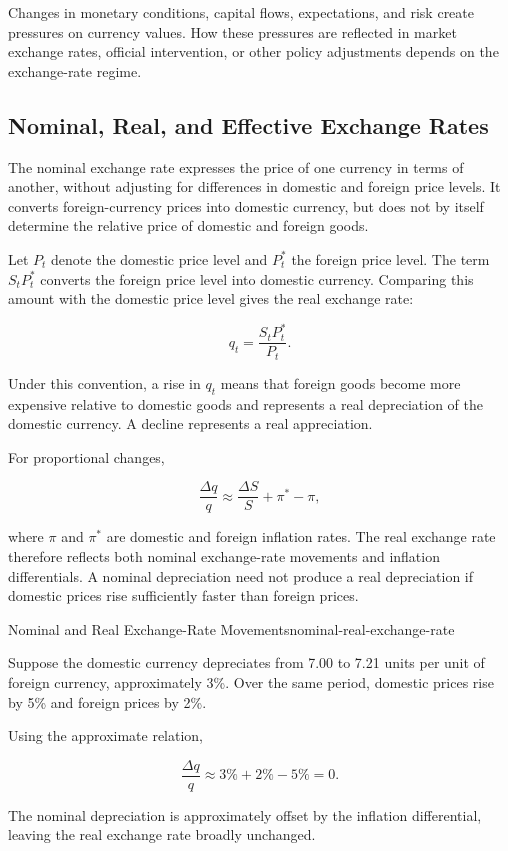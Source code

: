 Changes in monetary conditions, capital flows,
expectations, and risk create pressures on currency
values. How these pressures are reflected in market
exchange rates, official intervention, or other
policy adjustments depends on the exchange-rate regime.

\subsection{Nominal, Real, and Effective Exchange Rates}

The nominal exchange rate expresses the price of
one currency in terms of another, without adjusting
for differences in domestic and foreign price levels.
It converts foreign-currency prices into domestic
currency, but does not by itself determine the
relative price of domestic and foreign goods.

Let $P_t$ denote the domestic price level and $P_t^*$
the foreign price level. The term $S_tP_t^*$ converts
the foreign price level into domestic currency.
Comparing this amount with the domestic price level
gives the real exchange rate:

\begin{equation}
q_t
=
\frac{S_t P_t^{*}}{P_t}.
\label{eq:ch10-real-exchange-rate}
\end{equation}

Under this convention, a rise in $q_t$ means that foreign goods become more expensive relative to domestic goods and represents a real depreciation of the domestic currency. A decline represents a real appreciation.

For proportional changes,

\begin{equation}
\frac{\Delta q}{q}
\approx
\frac{\Delta S}{S}
+
\pi^{*}
-\pi,
\label{eq:ch10-real-exchange-rate-change}
\end{equation}

where $\pi$ and $\pi^{*}$ are domestic and foreign inflation rates. The real exchange rate therefore reflects both nominal exchange-rate movements and inflation differentials. A nominal depreciation need not produce a real depreciation if domestic prices rise sufficiently faster than foreign prices.

\begin{example}{Nominal and Real Exchange-Rate Movements}{nominal-real-exchange-rate}

Suppose the domestic currency depreciates from 7.00 to 7.21 units per unit of foreign currency, approximately 3\%. Over the same period, domestic prices rise by 5\% and foreign prices by 2\%.

Using the approximate relation,

$$
\frac{\Delta q}{q}
\approx
3\%+2\%-5\%=0.
$$

The nominal depreciation is approximately offset by the inflation differential, leaving the real exchange rate broadly unchanged.

\end{example}

